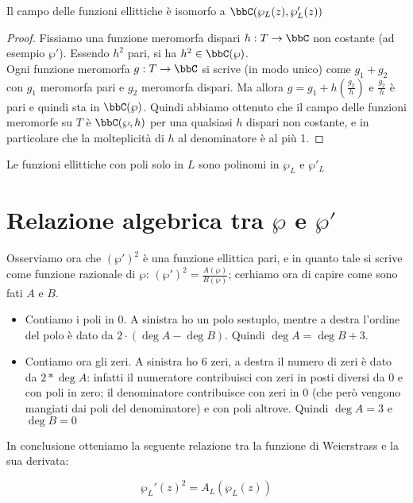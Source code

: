 \begin{teorema}
    Il campo delle funzioni ellittiche è isomorfo a $\bbC(\wp_L(z),\wp'_L(z))$
\end{teorema}
\begin{proof}
    Fissiamo una funzione meromorfa dispari $h:T\rar\bbC$ non costante (ad esempio $\wp'$).
    Essendo $h^2$ pari, si ha $h^2\in\bbC(\wp)$.\\
    Ogni funzione meromorfa $g:T\rar\bbC$ si scrive (in modo unico) come $g_1+g_2$ con $g_1$ meromorfa pari e $g_2$ meromorfa dispari.
    Ma allora $g=g_1+h(\frac{g_2}{h})$ e $\frac{g_2}{h}$ è pari e quindi sta in $\bbC(\wp)$.
    Quindi abbiamo ottenuto che il campo delle funzioni meromorfe su $T$ è $\bbC(\wp,h)$ per una qualsiasi $h$ dispari non costante, e in particolare che la molteplicità di $h$ al denominatore è al più 1.
\end{proof}

\begin{corollario}
    Le funzioni ellittiche con poli solo in $L$ sono polinomi in $\wp_L$ e $\wp'_L$
\end{corollario}



\section{Relazione algebrica tra $\wp$ e $\wp'$}
Osserviamo ora che $(\wp')^2$ è una funzione ellittica pari, e in quanto tale si scrive come funzione razionale di $\wp$:
$(\wp')^2=\frac{A(\wp)}{B(\wp)}$; cerhiamo ora di capire come sono fati $A$ e $B$.

\begin{itemize}
 \item Contiamo i poli in 0. A sinistra ho un polo sestuplo, mentre a destra l'ordine del polo è dato da $2\cdot (\deg A - \deg B)$. Quindi $\deg A = \deg B + 3$.
 \item Contiamo ora gli zeri. A sinistra ho 6 zeri, a destra il numero di zeri è dato da $2*\deg A$: infatti il numeratore contribuisci con zeri in posti diversi da 0 e con poli in zero; il denominatore contribuisce con zeri in 0 (che però vengono mangiati dai poli del denominatore) e con poli altrove. Quindi $\deg A = 3$ e $\deg B=0$
\end{itemize}

In conclusione otteniamo la seguente relazione tra la funzione di Weierstrass e la sua derivata:

$$\wp_L'(z)^2 = A_L(\wp_L(z)) $$

